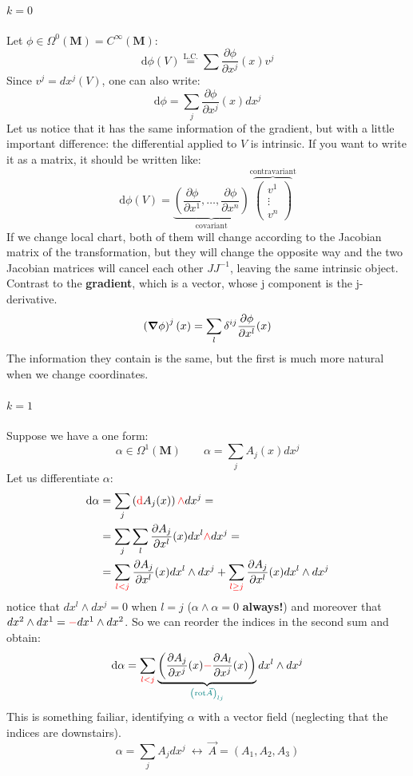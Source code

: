 \documentclass[../main.tex]{subfiles}
\begin{document}
\paragraph{\underline{$k=0$}}Let $\phi\in \Omega^0(\mathbf{M})=C^\infty(\mathbf{M})$:
\[
\textrm{d}\phi(V) \overset{\textrm{L.C.}}{=}\sum\frac{\partial\phi}{\partial x^j}(x)v^j
\]
Since $v^j=dx^j(V)$, one can also write:
\[
\textrm{d}\phi=\sum_j\frac{\partial\phi}{\partial x^j}(x)dx^j
\]
Let us notice that it has the same information of the gradient, but with a little important difference: the differential applied to $V$ is intrinsic. If you want to write it as a matrix, it should be written like:
\[
\textrm{d}\phi(V)=\underbrace{\left(\frac{\partial \phi}{\partial x^1}, \dots, \frac{\partial \phi}{\partial x^n}\right)}_{\textrm{covariant}}
\overbrace{
\begin{pmatrix}
v^1\\
\vdots\\
v^n
\end{pmatrix}
}^{\textrm{contravariant}}
\]
If we change local chart, both of them will change according to the Jacobian matrix of the transformation, but they will change the opposite way and the two Jacobian matrices will cancel each other $JJ^{-1}$, leaving the same intrinsic object. Contrast to the \textbf{gradient}, which is a vector, whose j component is the j-derivative. 
\[
\left(\grad \phi\right)^j(x)=\sum_l\delta^{ij}\frac{\partial\phi}{\partial x^l}(x)
\]
The information they contain is the same, but the first is much more natural when we change coordinates.
\paragraph{\underline{$k=1$}} Suppose we have a one form:
\[
\alpha \in \Omega^1(\mathbf{M}) \qquad \alpha = \sum_j A_j(x)dx^j
\]
Let us differentiate $\alpha$:
\[
\begin{split}
\textrm{d}\alpha
&=\sum_j\left({\color{red} \textrm{d}}A_j(x)\right){\color{red}\wedge}dx^j=\\
&=\sum_j\sum_l\frac{\partial A_j}{\partial x^l}(x)dx^l{\color{red}\wedge}dx^j=\\
&=\sum_{\color{red}l<j}\frac{\partial A_j}{\partial x^l}(x)dx^l\wedge dx^j+\sum_{\color{red}l\geq j}\frac{\partial A_j}{\partial x^l}(x)dx^l\wedge dx^j
\end{split}
\]
notice that $dx^l\wedge dx^j=0$ when $l=j$ ($\alpha \wedge\alpha=0$ \textbf{always!}) and moreover that $dx^2\wedge dx^1={\color{red}-}dx^1\wedge dx^2$. So we can reorder the indices in the second sum and obtain:
\[
\textrm{d}\alpha=\sum_{\color{red}l<j}\underbrace{\left(\frac{\partial A_j}{\partial x^j}(x){\color{red}-}\frac{\partial A_l}{\partial x^j}(x)\right)}_{\color{teal} \left(\textrm{rot}\Vec{A}\right)_{lj}}dx^l\wedge dx^j
\]
This is something failiar, identifying $\alpha$ with a vector field (neglecting that the indices are downstairs).
\[
\alpha = \sum_j A_jdx^j \ \longleftrightarrow \ \Vec{A}=\left(A_1,A_2,A_3\right)
\]
\end{document}
